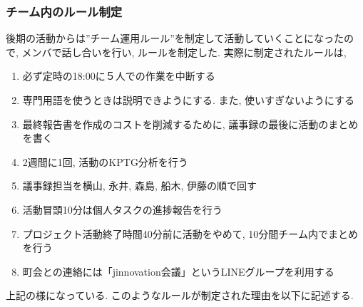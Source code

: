 \subsubsection{チーム内のルール制定}
後期の活動からは”チーム運用ルール”を制定して活動していくことになったので, メンバで話し合いを行い, ルールを制定した. 実際に制定されたルールは,
\begin{enumerate}
    \item 必ず定時の18:00に５人での作業を中断する
    \item 専門用語を使うときは説明できようにする. また, 使いすぎないようにする
    \item 最終報告書を作成のコストを削減するために, 議事録の最後に活動のまとめを書く
    \item 2週間に1回, 活動のKPTG分析を行う
    \item 議事録担当を横山, 永井, 森島, 船木, 伊藤の順で回す
    \item 活動冒頭10分は個人タスクの進捗報告を行う
    \item プロジェクト活動終了時間40分前に活動をやめて, 10分間チーム内でまとめを行う
    \item 町会との連絡には「jinnovation会議」というLINEグループを利用する
\end{enumerate}
上記の様になっている.
このようなルールが制定された理由を以下に記述する.
